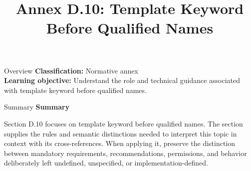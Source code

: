 \documentclass[10pt,letterpaper]{article}
\title{Annex D.10: Template Keyword Before Qualified Names}
\author{}
\date{}
\begin{document}
\maketitle
\begin{CornellOverviewBox}{Overview}
\textbf{Classification:} Normative annex\\[2pt]
\textbf{Learning objective:} Understand the role and technical guidance associated with template keyword before qualified names.
\end{CornellOverviewBox}\begin{CornellSummaryBox}{Summary}
{\sffamily\bfseries\color{Accent} Summary}\par\vspace{3pt}Section D.10 focuses on template keyword before qualified names. The section supplies the rules and semantic distinctions needed to interpret this topic in context with its cross-references. When applying it, preserve the distinction between mandatory requirements, recommendations, permissions, and behavior deliberately left undefined, unspecified, or implementation-defined.
\end{CornellSummaryBox}
\end{document}
